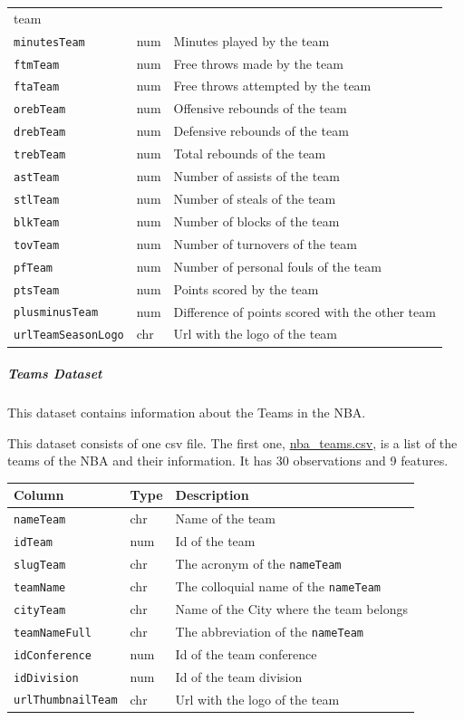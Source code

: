 \documentclass[
]{article}
\begin{document}
\begin{longtable}[]{@{}lll@{}}
team\tabularnewline
\texttt{minutesTeam} & num & Minutes played by the team\tabularnewline
\texttt{ftmTeam} & num & Free throws made by the team\tabularnewline
\texttt{ftaTeam} & num & Free throws attempted by the
team\tabularnewline
\texttt{orebTeam} & num & Offensive rebounds of the team\tabularnewline
\texttt{drebTeam} & num & Defensive rebounds of the team\tabularnewline
\texttt{trebTeam} & num & Total rebounds of the team\tabularnewline
\texttt{astTeam} & num & Number of assists of the team\tabularnewline
\texttt{stlTeam} & num & Number of steals of the team\tabularnewline
\texttt{blkTeam} & num & Number of blocks of the team\tabularnewline
\texttt{tovTeam} & num & Number of turnovers of the team\tabularnewline
\texttt{pfTeam} & num & Number of personal fouls of the
team\tabularnewline
\texttt{ptsTeam} & num & Points scored by the team\tabularnewline
\texttt{plusminusTeam} & num & Difference of points scored with the
other team\tabularnewline
\texttt{urlTeamSeasonLogo} & chr & Url with the logo of the
team\tabularnewline
\bottomrule
\end{longtable}

\hypertarget{teams-dataset}{%
\subparagraph{Teams Dataset}\label{teams-dataset}}

This dataset contains information about the Teams in the NBA.

This dataset consists of one csv file. The first one,
\href{https://github.com/AlmaProcesses/NBA_Project/blob/master/data/nba_teams.csv}{nba\_teams.csv},
is a list of the teams of the NBA and their information. It has 30
observations and 9 features.

\begin{longtable}[]{@{}lll@{}}
\toprule
Column & Type & Description\tabularnewline
\midrule
\endhead
\texttt{nameTeam} & chr & Name of the team\tabularnewline
\texttt{idTeam} & num & Id of the team\tabularnewline
\texttt{slugTeam} & chr & The acronym of the
\texttt{nameTeam}\tabularnewline
\texttt{teamName} & chr & The colloquial name of the
\texttt{nameTeam}\tabularnewline
\texttt{cityTeam} & chr & Name of the City where the team
belongs\tabularnewline
\texttt{teamNameFull} & chr & The abbreviation of the
\texttt{nameTeam}\tabularnewline
\texttt{idConference} & num & Id of the team conference\tabularnewline
\texttt{idDivision} & num & Id of the team division\tabularnewline
\texttt{urlThumbnailTeam} & chr & Url with the logo of the
team\tabularnewline
\bottomrule
\end{longtable}
\end{document}
